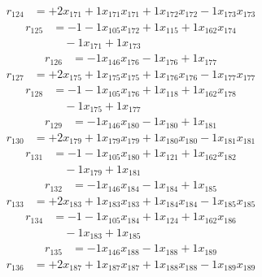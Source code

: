\[\begin{aligned}
r_{124} &= + 2 x_{171} + 1 x_{171} x_{171} + 1 x_{172} x_{172} - 1 x_{173} x_{173}
\end{aligned}\]
\[\begin{aligned}
r_{125} &= - 1 - 1 x_{105} x_{172} + 1 x_{115} + 1 x_{162} x_{174} \\
 &\quad - 1 x_{171} + 1 x_{173}
\end{aligned}\]
\[\begin{aligned}
r_{126} &= - 1 x_{146} x_{176} - 1 x_{176} + 1 x_{177}
\end{aligned}\]
\[\begin{aligned}
r_{127} &= + 2 x_{175} + 1 x_{175} x_{175} + 1 x_{176} x_{176} - 1 x_{177} x_{177}
\end{aligned}\]
\[\begin{aligned}
r_{128} &= - 1 - 1 x_{105} x_{176} + 1 x_{118} + 1 x_{162} x_{178} \\
 &\quad - 1 x_{175} + 1 x_{177}
\end{aligned}\]
\[\begin{aligned}
r_{129} &= - 1 x_{146} x_{180} - 1 x_{180} + 1 x_{181}
\end{aligned}\]
\[\begin{aligned}
r_{130} &= + 2 x_{179} + 1 x_{179} x_{179} + 1 x_{180} x_{180} - 1 x_{181} x_{181}
\end{aligned}\]
\[\begin{aligned}
r_{131} &= - 1 - 1 x_{105} x_{180} + 1 x_{121} + 1 x_{162} x_{182} \\
 &\quad - 1 x_{179} + 1 x_{181}
\end{aligned}\]
\[\begin{aligned}
r_{132} &= - 1 x_{146} x_{184} - 1 x_{184} + 1 x_{185}
\end{aligned}\]
\[\begin{aligned}
r_{133} &= + 2 x_{183} + 1 x_{183} x_{183} + 1 x_{184} x_{184} - 1 x_{185} x_{185}
\end{aligned}\]
\[\begin{aligned}
r_{134} &= - 1 - 1 x_{105} x_{184} + 1 x_{124} + 1 x_{162} x_{186} \\
 &\quad - 1 x_{183} + 1 x_{185}
\end{aligned}\]
\[\begin{aligned}
r_{135} &= - 1 x_{146} x_{188} - 1 x_{188} + 1 x_{189}
\end{aligned}\]
\[\begin{aligned}
r_{136} &= + 2 x_{187} + 1 x_{187} x_{187} + 1 x_{188} x_{188} - 1 x_{189} x_{189}
\end{aligned}\]
